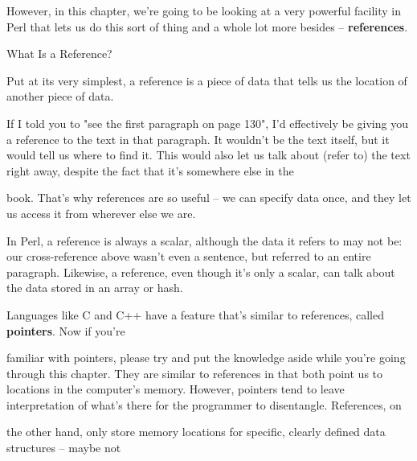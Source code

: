 \documentclass[a4paper,11pt]{book}
\begin{document}
\noindent 

\noindent However, in this chapter, we're going to be looking at a very powerful facility in Perl that lets us do this sort of thing and a whole lot more besides -- \textbf{references}.

\noindent 

\noindent 

\noindent What Is a Reference?

\noindent 

\noindent Put at its very  simplest,  a  reference  is  a  piece  of  data  that  tells  us  the location  of  another  piece  of  data.

\noindent If  I told you  to  "see the first paragraph  on  page  130",  I'd effectively  be  giving  you  a  reference  to  the text  in that  paragraph.  It wouldn't  be the  text  itself,  but  it  would  tell  us  where  to  find  it.  This would also  let us talk about (refer to)  the  text  right  away,  despite  the fact  that  it's  somewhere  else  in  the

\noindent book.  That's why  references are  so  useful  --  we can  specify  data  once,  and they  let us  access  it  from wherever else we are.

\noindent 

\noindent In Perl, a reference is always a scalar, although the data it refers to may not be: our cross-reference above wasn't even a sentence, but referred to an entire paragraph. Likewise, a reference, even though it's only a scalar, can talk about the data stored in an array or hash.

\noindent  

\noindent  

\noindent  

\noindent  

\noindent 

\noindent 

\noindent Languages like  C and C++  have  a  feature  that's  similar  to  references,  called  \textbf{pointers}.  Now  if  you're

\noindent familiar with  pointers,  please  try  and  put  the  knowledge  aside  while  you're  going  through  this  chapter. They are  similar to  references  in  that  both  point  us  to  locations  in  the computer's  memory. However, pointers tend to  leave  interpretation  of what's  there  for  the  programmer  to  disentangle.  References,  on

\noindent the other hand, only store memory  locations  for  specific,  clearly  defined  data  structures  --  maybe  not
\end{document}
